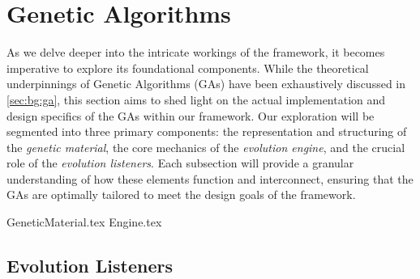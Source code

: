 \section{Genetic Algorithms}
\label{sec:genetic_algorithms}
  As we delve deeper into the intricate workings of the framework, it becomes 
  imperative to explore its foundational components.
  While the theoretical underpinnings of Genetic Algorithms (GAs) have been 
  exhaustively discussed in \vref{sec:bg:ga}, this section aims to shed light 
  on the actual implementation and design specifics of the GAs within our 
  framework.
  Our exploration will be segmented into three primary components: the 
  representation and structuring of the \emph{genetic material}, the core 
  mechanics of the \emph{evolution engine}, and the crucial role of the 
  \emph{evolution listeners}.
  Each subsection will provide a granular understanding of how these elements 
  function and interconnect, ensuring that the GAs are optimally tailored to 
  meet the design goals of the framework.
  
  {GeneticMaterial.tex}
  {Engine.tex}    
  
  \subsection{Evolution Listeners}
  \label{sec:keen:ga:listeners}
    \Blindtext
